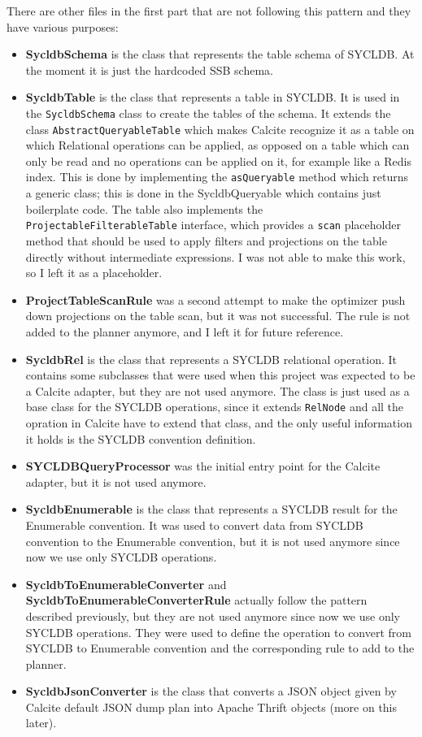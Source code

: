 \documentclass[a4paper, 10pt]{article}
\begin{document}
There are other files in the first part that are not following this pattern and they have various purposes:
\begin{itemize}
    \item \textbf{SycldbSchema} is the class that represents the table schema of SYCLDB. At the moment it is just the hardcoded SSB schema.
    \item \textbf{SycldbTable} is the class that represents a table in SYCLDB. It is used in the \texttt{SycldbSchema} class to create the tables of the schema. It extends the class \texttt{AbstractQueryableTable} which makes Calcite recognize it as a table on which Relational operations can be applied, as opposed on a table which can only be read and no operations can be applied on it, for example like a Redis index. This is done by implementing the \texttt{asQueryable} method which returns a generic class; this is done in the SycldbQueryable which contains just boilerplate code. The table also implements the \texttt{ProjectableFilterableTable} interface, which provides a \texttt{scan} placeholder method that should be used to apply filters and projections on the table directly without intermediate expressions. I was not able to make this work, so I left it as a placeholder.
    \item \textbf{ProjectTableScanRule} was a second attempt to make the optimizer push down projections on the table scan, but it was not successful. The rule is not added to the planner anymore, and I left it for future reference.
    \item \textbf{SycldbRel} is the class that represents a SYCLDB relational operation. It contains some subclasses that were used when this project was expected to be a Calcite adapter, but they are not used anymore. The class is just used as a base class for the SYCLDB operations, since it extends \texttt{RelNode} and all the opration in Calcite have to extend that class, and the only useful information it holds is the SYCLDB convention definition.
    \item \textbf{SYCLDBQueryProcessor} was the initial entry point for the Calcite adapter, but it is not used anymore.
    \item \textbf{SycldbEnumerable} is the class that represents a SYCLDB result for the Enumerable convention. It was used to convert data from SYCLDB convention to the Enumerable convention, but it is not used anymore since now we use only SYCLDB operations.
    \item \textbf{SycldbToEnumerableConverter} and \textbf{SycldbToEnumerableConverterRule} actually follow the pattern described previously, but they are not used anymore since now we use only SYCLDB operations. They were used to define the operation to convert from SYCLDB to Enumerable convention and the corresponding rule to add to the planner.
    \item \textbf{SycldbJsonConverter} is the class that converts a JSON object given by Calcite default JSON dump plan into Apache Thrift objects (more on this later).
\end{itemize}
\end{document}
